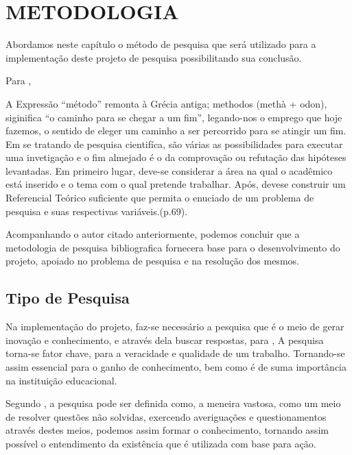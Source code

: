 \chapter{METODOLOGIA}

\par Abordamos neste capítulo o método de pesquisa que será utilizado para a implementação
deste projeto de pesquisa possibilitando sua conclusão.

\par Para ,

\begin{citacao}
	A Expressão “método” remonta à Grécia antiga; methodos (methà + odon),
	siginifica “o caminho para se chegar a um fim”, legando-nos o emprego que
	hoje fazemos, o sentido de eleger um caminho a ser percorrido para se atingir
	um fim. Em se tratando de pesquisa cientifíca, são várias as possibilidades
	para executar uma invetigação e o fim almejado é o da comprovação ou refutação
	das hipóteses levantadas. Em primeiro lugar, deve-se considerar a área na qual
	o acadêmico está inserido e o tema com o qual pretende trabalhar. Após, devese
	construir um Referencial Teórico suficiente que permita o enuciado de um
	problema de pesquisa e suas respectivas variáveis.(p.69). 
\end{citacao}

\par Acompanhando o autor citado anteriormente, podemos concluir que a metodologia de
pesquisa bibliografica fornecera base para o desenvolvimento do projeto, apoiado no problema
de pesquisa e na resolução dos mesmos.

\section{Tipo de Pesquisa}

\par Na implementação do projeto, faz-se necessário a pesquisa que é o meio de 
gerar inovação e conhecimento, e através dela buscar respostas, para 
, A pesquisa torna-se fator chave, para a
veracidade e qualidade de um trabalho. Tornando-se assim essencial para o ganho
de conhecimento, bem como é de suma importância na instituição educacional.
  
\par Segundo , a pesquisa pode ser definida como, a
meneira vastosa, como um meio de resolver questões não solvidas, exercendo averiguações e questionamentos através
destes meios, podemos assim formar o conhecimento, tornando assim possível o entendimento
da existência que é utilizada com base para ação.

